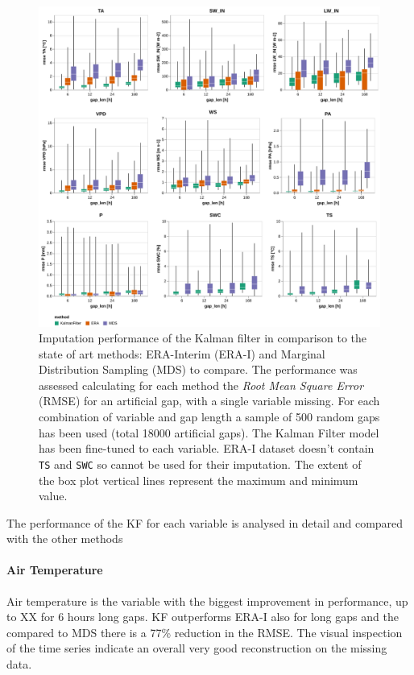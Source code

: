 \documentclass{article}
\newcommand{\imgwidth}{6in}
\begin{document}
\begin{figure}
    \centerline{\includegraphics[width=\imgwidth]{images2/the_plot}}
\caption{ Imputation performance of the Kalman filter in comparison to the state of art methods: ERA-Interim (ERA-I) and Marginal Distribution Sampling (MDS) to compare. The performance was assessed calculating for each method the \textit{Root Mean Square Error} (RMSE) for an artificial gap, with a single variable missing. For each combination of variable and gap length a sample of 500 random gaps has been used (total 18000 artificial gaps).
The Kalman Filter model has been fine-tuned to each variable. ERA-I dataset doesn't contain \texttt{TS} and \texttt{SWC} so cannot be used for their imputation. The extent of the box plot vertical lines represent the maximum and minimum value.}
\label{fig:the_plot}
\end{figure}



The performance of the KF for each variable is analysed in detail and compared with the other methods

\paragraph{Air Temperature} Air temperature is the variable with the biggest improvement in performance, up to XX for 6 hours long gaps. KF outperforms ERA-I also for long gaps and the compared to MDS there is a 77\% reduction in the RMSE. The visual inspection of the time series indicate an overall very good reconstruction on the missing data. 
\end{document}
